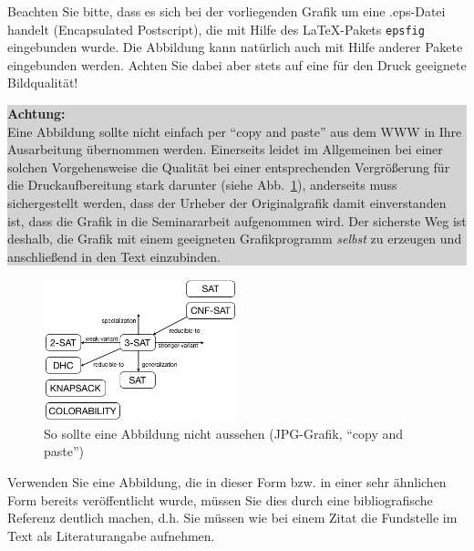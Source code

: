Beachten Sie bitte, dass es sich bei der vorliegenden Grafik um eine .eps-Datei handelt (Encapsulated Postscript), die mit Hilfe des \LaTeX-Pakets {\tt epsfig} eingebunden wurde.
Die Abbildung kann natürlich auch mit Hilfe anderer Pakete eingebunden werden.
Achten Sie dabei aber stets auf eine für den Druck geeignete Bildqualität!

\smallskip

\begin{center}
\colorbox{lightgray}{
\parbox{140mm}{
{\bf Achtung:} \\
Eine Abbildung sollte nicht einfach per "`copy and paste"' aus dem WWW in Ihre Ausarbeitung übernommen werden.
Einerseits leidet im Allgemeinen bei einer solchen Vorgehensweise die Qualität bei einer entsprechenden Vergrößerung für die Druckaufbereitung stark darunter (siehe Abb.~\ref{fig_Abb2}), anderseits muss sichergestellt werden, dass der Urheber der Originalgrafik damit einverstanden ist, dass die Grafik in die Seminararbeit aufgenommen wird.
Der sicherste Weg ist deshalb, die Grafik mit einem geeigneten Grafikprogramm {\em selbst} zu erzeugen und anschließend in den Text einzubinden.}}
\end{center}

\begin{figure}[ht]
  \begin{center}\includegraphics[width=0.5\textwidth]{images/3sat.png}\end{center}
  \caption{So sollte eine Abbildung nicht aussehen (JPG-Grafik, "`copy and paste"')}
  \label{fig_Abb2}
\end{figure}
Verwenden Sie eine Abbildung, die in dieser Form bzw. in einer sehr ähnlichen Form bereits veröffentlicht wurde, müssen Sie dies durch eine bibliografische Referenz deutlich machen, d.h. Sie müssen wie bei einem Zitat die Fundstelle im Text als Literaturangabe aufnehmen.




